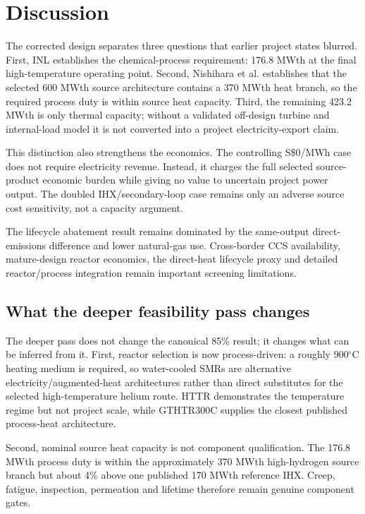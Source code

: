 \section{Discussion}
The corrected design separates three questions that earlier project states blurred. First, INL establishes the chemical-process requirement: 176.8 MWth at the final high-temperature operating point. Second, Nishihara et al. establishes that the selected 600 MWth source architecture contains a 370 MWth heat branch, so the required process duty is within source heat capacity. Third, the remaining 423.2 MWth is only thermal capacity; without a validated off-design turbine and internal-load model it is not converted into a project electricity-export claim.

This distinction also strengthens the economics. The controlling S\$0/MWh case does not require electricity revenue. Instead, it charges the full selected source-product economic burden while giving no value to uncertain project power output. The doubled IHX/secondary-loop case remains only an adverse source cost sensitivity, not a capacity argument.

The lifecycle abatement result remains dominated by the same-output direct-emissions difference and lower natural-gas use. Cross-border CCS availability, mature-design reactor economics, the direct-heat lifecycle proxy and detailed reactor/process integration remain important screening limitations.


\subsection{What the deeper feasibility pass changes}
The deeper pass does not change the canonical 85\% result; it changes what can be inferred from it.  First, reactor selection is now process-driven: a roughly 900$^\circ$C heating medium is required, so water-cooled SMRs are alternative electricity/augmented-heat architectures rather than direct substitutes for the selected high-temperature helium route.  HTTR demonstrates the temperature regime but not project scale, while GTHTR300C supplies the closest published process-heat architecture.

Second, nominal source heat capacity is not component qualification.  The 176.8 MWth process duty is within the approximately 370 MWth high-hydrogen source branch but about 4\% above one published 170 MWth reference IHX.  Creep, fatigue, inspection, permeation and lifetime therefore remain genuine component gates.

